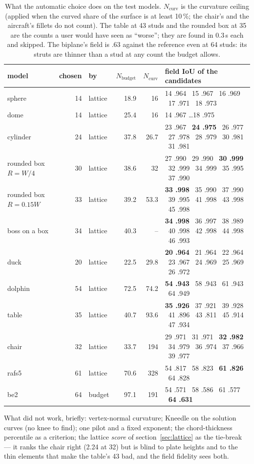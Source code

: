 \begin{table}[H]
\centering\small
\begin{tabular}{lrlrrl}
\toprule
model & chosen & by & $N_{\text{budget}}$ & $N_{\text{curv}}$ & field IoU of the candidates \\
\midrule
sphere & 14 & lattice & 18.9 & 16 & 14 .964 \ 15 .967 \ 16 .969 \ 17 .971 \ 18 .973 \\
dome & 14 & lattice & 25.4 & 16 & 14 .967 \ldots 18 .975 \\
cylinder & 24 & lattice & 37.8 & 26.7 & 23 .967 \ \textbf{24 .975} \ 26 .977 \ 27 .978 \ 28 .979 \ 30 .981 \ 31 .981 \\
rounded box $R = W/4$ & 30 & lattice & 38.6 & 32 & 27 .990 \ 29 .990 \ \textbf{30 .999} \ 32 .999 \ 34 .999 \ 35 .995 \ 37 .990 \\
rounded box $R = 0.15W$ & 33 & lattice & 39.2 & 53.3 & \textbf{33 .998} \ 35 .990 \ 37 .990 \ 39 .995 \ 41 .998 \ 43 .998 \ 45 .998 \\
boss on a box & 34 & lattice & 40.3 & -- & \textbf{34 .998} \ 36 .997 \ 38 .989 \ 40 .998 \ 42 .998 \ 44 .998 \ 46 .993 \\
duck & 20 & lattice & 22.5 & 29.8 & \textbf{20 .964} \ 21 .964 \ 22 .964 \ 23 .967 \ 24 .969 \ 25 .969 \ 26 .972 \\
dolphin & 54 & lattice & 72.5 & 74.2 & \textbf{54 .943} \ 58 .943 \ 61 .943 \ 64 .949 \\
table & 35 & lattice & 40.7 & 93.6 & \textbf{35 .926} \ 37 .921 \ 39 .928 \ 41 .896 \ 43 .811 \ 45 .914 \ 47 .934 \\
chair & 32 & lattice & 33.7 & 194 & 29 .971 \ 31 .971 \ \textbf{32 .982} \ 34 .979 \ 36 .974 \ 37 .966 \ 39 .977 \\
rafs5 & 61 & lattice & 70.6 & 328 & 54 .817 \ 58 .823 \ \textbf{61 .826} \ 64 .828 \\
be2 & 64 & budget & 97.1 & 191 & 54 .571 \ 58 .586 \ 61 .577 \ \textbf{64 .631} \\
\bottomrule
\end{tabular}
\caption{What the automatic choice does on the test models. $N_{\text{curv}}$ is the curvature ceiling (applied when the curved
share of the surface is at least 10\,\%; the chair's and the aircraft's fillets do not count). The table at 43 studs and the
rounded box at 35 are the counts a user would have seen as ``worse''; they are found in 0.3\,s each and skipped. The biplane's
field is .63 against the reference even at 64 studs: its struts are thinner than a stud at any count the budget allows.}
\end{table}

What did not work, briefly: vertex-normal curvature; Kneedle on the solution curves (no knee to find); one pilot and a fixed
exponent; the chord-thickness percentile as a criterion; the lattice \emph{score} of section~\ref{sec:lattice} as the tie-break
--- it ranks the chair right (2.24 at 32) but is blind to plate heights and to the thin elements that make the table's 43 bad,
and the field fidelity sees both.
